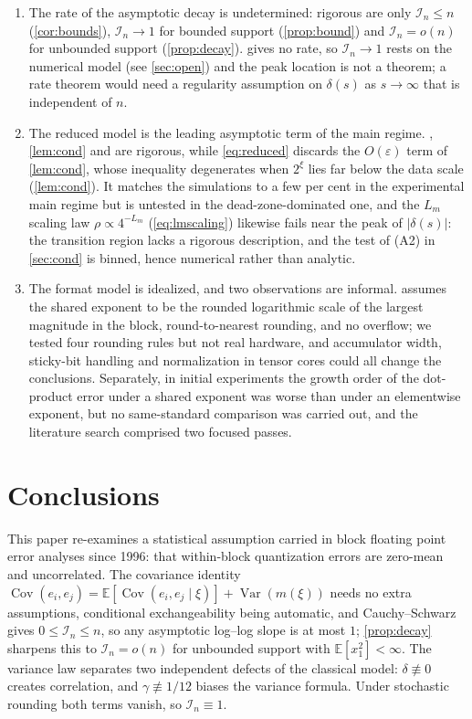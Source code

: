 \documentclass[review,hidelinks,oneeqnum,onetabnum,onefignum,onethmnum]{siamart251216}
\begin{document}
\begin{enumerate}
\item The rate of the asymptotic decay is undetermined: rigorous are only
$\mathcal I_n\le n$ (\cref{cor:bounds}), $\mathcal I_n\to1$ for bounded support
(\cref{prop:bound}) and $\mathcal I_n=o(n)$ for unbounded support
(\cref{prop:decay}).  gives no rate, so $\mathcal I_n\to1$ rests on
the numerical model (see \cref{sec:open}) and the peak location is not a theorem; a
rate theorem would need a regularity assumption on $\delta(s)$ as $s\to\infty$ that
is independent of $n$.

\item The reduced model is the leading asymptotic term of the main regime.
, \cref{lem:cond} and
 are rigorous, while \cref{eq:reduced} discards the
$O(\varepsilon)$ term of \cref{lem:cond}, whose inequality degenerates when $2^\xi$
lies far below the data scale (\cref{lem:cond}). It matches the simulations to a
few per cent in the experimental main regime but is untested in the
dead-zone-dominated one, and the $L_m$ scaling law $\rho\propto4^{-L_m}$
(\cref{eq:lmscaling}) likewise fails near the peak of $|\delta(s)|$: the transition
region lacks a rigorous description, and the test of (A2) in \cref{sec:cond} is
binned, hence numerical rather than analytic.

\item The format model is idealized, and two observations are informal.
 assumes the shared exponent to be the rounded logarithmic scale of
the largest magnitude in the block, round-to-nearest rounding, and no overflow; we
tested four rounding rules but not real hardware, and accumulator width, sticky-bit
handling and normalization in tensor cores could all change the conclusions.
Separately, in initial experiments the growth order of the dot-product error under
a shared exponent was worse than under an elementwise exponent, but no
same-standard comparison was carried out, and the literature search comprised two
focused passes.
\end{enumerate}

\section{Conclusions}
\label{sec:conclusions}

This paper re-examines a statistical assumption carried in block floating point
error analyses since 1996: that within-block quantization errors are zero-mean and
uncorrelated. The covariance identity
$\operatorname{Cov}(e_i,e_j)=\mathbb{E}[\operatorname{Cov}(e_i,e_j\mid\xi)]
+\operatorname{Var}(m(\xi))$ needs no extra assumptions, conditional
exchangeability being automatic, and Cauchy--Schwarz gives
$0\le\mathcal I_n\le n$, so any asymptotic log--log slope is at most $1$;
\cref{prop:decay} sharpens this to $\mathcal I_n=o(n)$ for unbounded support with
$\mathbb{E}[x_1^2]<\infty$. The variance law separates two independent defects of
the classical model: $\delta\not\equiv0$ creates correlation, and
$\gamma\not\equiv1/12$ biases the variance formula. Under stochastic rounding
both terms vanish, so $\mathcal I_n\equiv1$.
\end{document}
